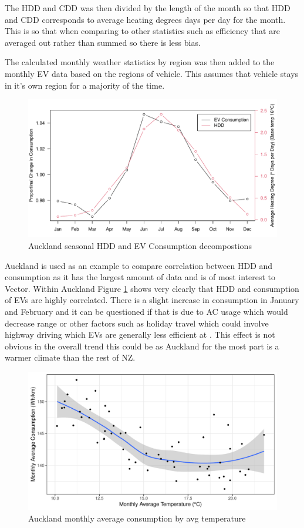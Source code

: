 \documentclass[
]{article}
\begin{document}
The HDD and CDD was then divided by the length of the month so that HDD
and CDD corresponds to average heating degrees days per day for the
month. This is so that when comparing to other statistics such as
efficiency that are averaged out rather than summed so there is less
bias.

The calculated monthly weather statistics by region was then added to
the monthly EV data based on the regions of vehicle. This assumes that
vehicle stays in it's own region for a majority of the time.

\begin{figure}
\centering
\includegraphics{final_report_files/figure-latex/consum_HDD_plot-1.pdf}
\caption{Auckland seasonal HDD and EV Consumption
decompostions\label{fig:consum_HDD_plot}}
\end{figure}

Auckland is used as an example to compare correlation between HDD and
consumption as it has the largest amount of data and is of most interest
to Vector. Within Auckland Figure \ref{fig:consum_HDD_plot} shows very
clearly that HDD and consumption of EVs are highly correlated. There is
a slight increase in consumption in January and February and it can be
questioned if that is due to AC usage which would decrease range
\cite{ev_range} or other factors such as holiday travel which could
involve highway driving which EVs are generally less efficient at
\cite{ev_highway}. This effect is not obvious in the overall trend this
could be as Auckland for the most part is a warmer climate than the rest
of NZ.

\begin{figure}
\centering
\includegraphics{final_report_files/figure-latex/temp_consum_plot-1.pdf}
\caption{Auckland monthly average consumption by avg
temperature\label{fig:temp_consum_plot}}
\end{figure}
\end{document}
